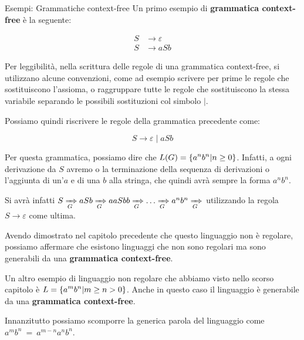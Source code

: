 \newpage
\begin{generalbox}[colframe=azure-gradient-3!90!black]{Esempi: Grammatiche context-free}
  Un primo esempio di \textbf{grammatica context-free} è la seguente:

  \begin{equation}
    \begin{split}
      S &\to \varepsilon\\
      S &\to aSb
    \end{split}
  \end{equation}

  Per leggibilità, nella scrittura delle regole di una grammatica context-free, si utilizzano alcune convenzioni, come ad esempio scrivere per prime le regole che sostituiscono l'assioma, o raggruppare tutte le regole che sostituiscono la stessa variabile separando le possibili sostituzioni col simbolo \(\mid\).

  Possiamo quindi riscrivere le regole della grammatica precedente come:

  \begin{equation}
    S \to \varepsilon \mid aSb
  \end{equation}

  Per questa grammatica, possiamo dire che $L(G) = \displaystyle{\left\{{a^{n}b^n \vert n \geq 0}\right\}} $. Infatti, a ogni derivazione da $S$ avremo o la terminazione della sequenza di derivazioni o l'aggiunta di un'$a$ e di una $b$ alla stringa, che quindi avrà sempre la forma $a^{n}b^n$.

  \medskip

  Si avrà infatti $S \xRightarrow[G]{} aSb \xRightarrow[G]{} aaSbb \xRightarrow[G]{} \dots \xRightarrow[G]{} a^{n}b^n \xRightarrow[G]{} $ utilizzando la regola $S \to \varepsilon $ come ultima.

  \medskip

  Avendo dimostrato nel capitolo precedente che questo linguaggio non è regolare, possiamo affermare che esistono linguaggi che non sono regolari ma sono generabili da una \textbf{grammatica context-free}.

  \bigskip

  Un altro esempio di linguaggio non regolare che abbiamo visto nello scorso capitolo è $ L= \displaystyle{\left\{{a^{m}b^{n} \vert m \geq n > 0}\right\}} $. Anche in questo caso il linguaggio è generabile da una \textbf{grammatica context-free}.

  \medskip

  Innanzitutto possiamo scomporre la generica parola del linguaggio come $a^{m}b^{n}\ =\ a^{m-n}a^{n}b^{n}$.


\end{generalbox}
